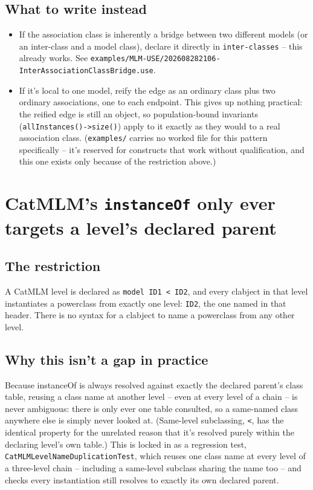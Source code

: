 \documentclass[11pt,twoside,a4paper]{book}
\begin{document}
\subsection{What to write instead}
\label{sec:orgd01f9c8}

\begin{itemize}
\item If the association class is inherently a bridge between two different
models (or an inter-class and a model class), declare it directly in
\texttt{inter-classes} -- this already works. See
\texttt{examples/MLM-USE/202608282106-InterAssociationClassBridge.use}.
\item If it's local to one model, reify the edge as an ordinary class plus
two ordinary associations, one to each endpoint. This gives up nothing
practical: the reified edge is still an object, so population-bound
invariants (\texttt{allInstances()->size()}) apply to it exactly as they would
to a real association class. (\texttt{examples/} carries no worked file for
this pattern specifically -- it's reserved for constructs that work
without qualification, and this one exists only because of the
restriction above.)
\end{itemize}

\section{CatMLM's \texttt{instanceOf} only ever targets a level's declared parent}
\label{sec:orgfab7917}

\subsection{The restriction}
\label{sec:orgf3b0a55}

A CatMLM level is declared as \texttt{model ID1 < ID2}, and every clabject in
that level instantiates a powerclass from exactly one level: \texttt{ID2}, the
one named in that header. There is no syntax for a clabject to name a
powerclass from any other level.

\subsection{Why this isn't a gap in practice}
\label{sec:org761e5a1}

Because instanceOf is always resolved against exactly the declared
parent's class table, reusing a class name at another level -- even at
every level of a chain -- is never ambiguous: there is only ever one
table consulted, so a same-named class anywhere else is simply never
looked at. (Same-level subclassing, \texttt{<}, has the identical property for
the unrelated reason that it's resolved purely within the declaring
level's own table.) This is locked in as a regression test,
\texttt{CatMLMLevelNameDuplicationTest}, which reuses one class name at every
level of a three-level chain -- including a same-level subclass sharing
the name too -- and checks every instantiation still resolves to exactly
its own declared parent.
\end{document}
